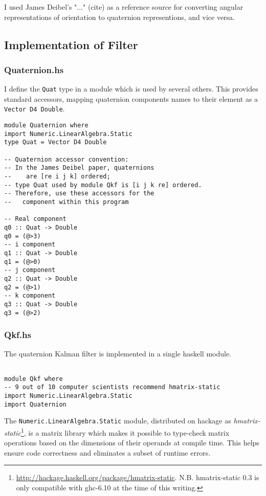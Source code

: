 \documentclass[12pt]{report}
\begin{document}
I used James Deibel's "..." (cite) as a reference source for converting angular representations of orientation to quaternion representions, and vice versa. 

\subsection{Implementation of Filter}

\subsubsection{Quaternion.hs}
I define the \lstinline$Quat$ type in a module which is used by several others. This provides standard accessors, mapping quaternion components names to their element as a \lstinline$Vector D4 Double$.
\begin{lstlisting}
module Quaternion where
import Numeric.LinearAlgebra.Static
type Quat = Vector D4 Double

-- Quaternion accessor convention:
-- In the James Deibel paper, quaternions 
--    are [re i j k] ordered; 
-- type Quat used by module Qkf is [i j k re] ordered.
-- Therefore, use these accessors for the 
--   component within this program

-- Real component
q0 :: Quat -> Double
q0 = (@>3) 
-- i component
q1 :: Quat -> Double
q1 = (@>0)
-- j component
q2 :: Quat -> Double
q2 = (@>1) 
-- k component
q3 :: Quat -> Double
q3 = (@>2) 
\end{lstlisting}

\subsubsection{Qkf.hs}
The quaternion Kalman filter is implemented in a single haskell module.
\begin{lstlisting}

module Qkf where
-- 9 out of 10 computer scientists recommend hmatrix-static
import Numeric.LinearAlgebra.Static
import Quaternion
\end{lstlisting}


The \lstinline$Numeric.LinearAlgebra.Static$ module, distributed on hackage as \emph{hmatrix-static}\footnote{\url{http://hackage.haskell.org/package/hmatrix-static}. N.B. hmatrix-static 0.3 is only compatible with ghc-6.10 at the time of this writing.}, 
is a matrix library which makes it possible to type-check matrix operations based on the dimensions of their operands at compile time. This helps ensure code correctness and eliminates a subset of runtime errors.
\end{document}
